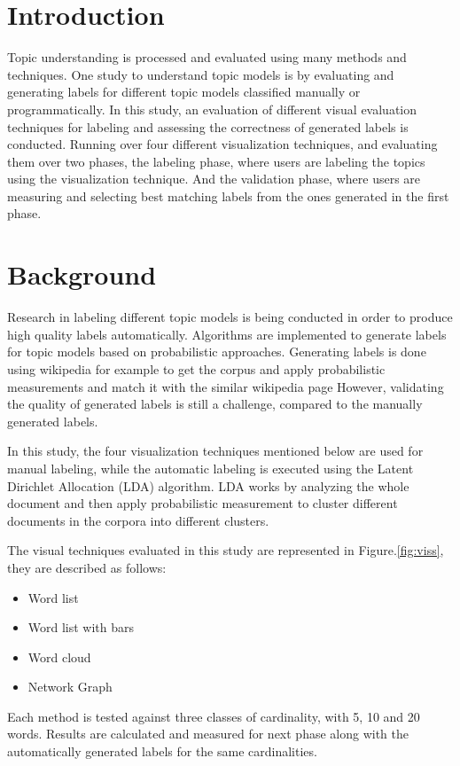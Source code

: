 \section{Introduction}
\label{sec:intro}

Topic understanding is processed and evaluated using many methods and techniques. One study to understand topic models is by evaluating and
generating labels for different topic models classified manually or programmatically. In this study, an evaluation of different visual evaluation techniques
for labeling and assessing the correctness of generated labels is conducted. Running over four different visualization techniques, and evaluating them
over two phases, the labeling phase, where users are labeling the topics using the visualization technique. And the validation phase, where users are
measuring and selecting best matching labels from the ones generated in the first phase.

\section{Background}
\label{sec:bg}

Research in labeling different topic models is being conducted in order to produce high quality labels automatically. Algorithms are implemented
to generate labels for topic models based on probabilistic approaches. Generating labels
is done using wikipedia for example to get the corpus and apply probabilistic measurements and match it with the similar wikipedia page
However, validating the quality of generated labels is still a challenge, compared to the manually generated labels.
\newParagraph

In this study, the four visualization techniques mentioned below are used for manual labeling, while the automatic labeling is executed using the
Latent Dirichlet Allocation (LDA) algorithm. LDA works by analyzing the whole document and then apply probabilistic measurement to cluster different documents
in the corpora into different clusters.
\newParagraph


The visual techniques evaluated in this study are represented in Figure.\ref{fig:viss}, they are described as follows:
\begin{itemize}
  \item Word list
  \item Word list with bars
  \item Word cloud
  \item Network Graph
\end{itemize}

Each method is tested against three classes of cardinality, with 5, 10 and 20 words. Results are calculated and measured for next phase along with the automatically
generated labels for the same cardinalities.

